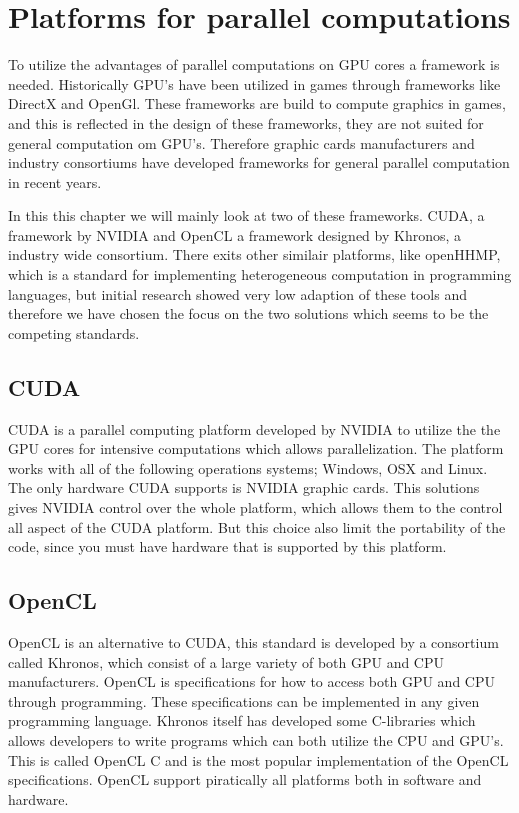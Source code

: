 \section{Platforms for parallel computations}
To utilize the advantages of parallel computations on GPU cores a framework is needed.
Historically GPU's have been utilized in games through frameworks like DirectX and OpenGl.
These frameworks are build to compute graphics in games, and this is reflected in the design of these frameworks, they are not suited for general computation om GPU's.
Therefore graphic cards manufacturers and industry consortiums have developed frameworks for general parallel computation in recent years.

In this this chapter we will mainly look at two of these frameworks.
CUDA, a framework by NVIDIA and OpenCL a framework designed by Khronos, a industry wide consortium.\citep{CUDA, OpenCL}
There exits other similair platforms, like openHHMP, which is a standard for implementing heterogeneous computation in programming languages, but initial research showed very low adaption of these tools and therefore we have chosen the focus on the two solutions which seems to be the competing standards. 

\subsection{CUDA}
CUDA is a parallel computing platform developed by NVIDIA to utilize the the GPU cores for intensive computations which allows parallelization.
The platform works with all of the following operations systems; Windows, OSX and Linux.
The only hardware CUDA supports is NVIDIA graphic cards. 
This solutions gives NVIDIA control over the whole platform, which allows them to the control all aspect of the CUDA platform.
But this choice also limit the  portability of the code, since you must have hardware that is supported by this platform. \citep{CUDAfaq}

\subsection{OpenCL}
OpenCL is an alternative to CUDA, this standard is developed by a consortium called Khronos, which consist of a large variety of both GPU and CPU manufacturers.
OpenCL is specifications for how to access both GPU and CPU through programming.
These specifications can be implemented in any given programming language.
Khronos itself has developed some C-libraries which allows developers to write programs which can both utilize the CPU and GPU's.
This is called OpenCL C and is the most popular implementation of the OpenCL specifications.
OpenCL support piratically all platforms both in software and hardware. 

